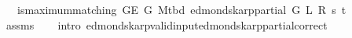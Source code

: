 \begin{isabellebody}
\ \ \ {\isachardoublequoteopen}is{\isacharunderscore}{\kern0pt}maximum{\isacharunderscore}{\kern0pt}matching\ {\isacharparenleft}{\kern0pt}G{\isachardot}{\kern0pt}E\ G{\isacharparenright}{\kern0pt}\ {\isacharparenleft}{\kern0pt}M{\isacharunderscore}{\kern0pt}tbd\ {\isacharparenleft}{\kern0pt}edmonds{\isacharunderscore}{\kern0pt}karp{\isacharunderscore}{\kern0pt}partial\ G\ L\ R\ s\ t{\isacharparenright}{\kern0pt}{\isacharparenright}{\kern0pt}{\isachardoublequoteclose}\isanewline
%
\isadelimproof
\ \ %
\endisadelimproof
%
\isatagproof
{}\isamarkupfalse%
\ assms\isanewline
\ \ \isamarkupfalse%
\ {\isacharparenleft}{\kern0pt}intro\ edmonds{\isacharunderscore}{\kern0pt}karp{\isacharunderscore}{\kern0pt}valid{\isacharunderscore}{\kern0pt}input{\isachardot}{\kern0pt}edmonds{\isacharunderscore}{\kern0pt}karp{\isacharunderscore}{\kern0pt}partial{\isacharunderscore}{\kern0pt}correct{\isacharparenright}{\kern0pt}%
\endisatagproof
{\isafoldproof}%
%
\isadelimproof
\isanewline
%
\endisadelimproof
\isanewline
\isanewline
%
\isadelimtheory
\isanewline
%
\endisadelimtheory
%
\isatagtheory
{}\isamarkupfalse%
%
\endisatagtheory
{\isafoldtheory}%
%
\isadelimtheory
%
\endisadelimtheory
%
\end{isabellebody}%
\endinput
